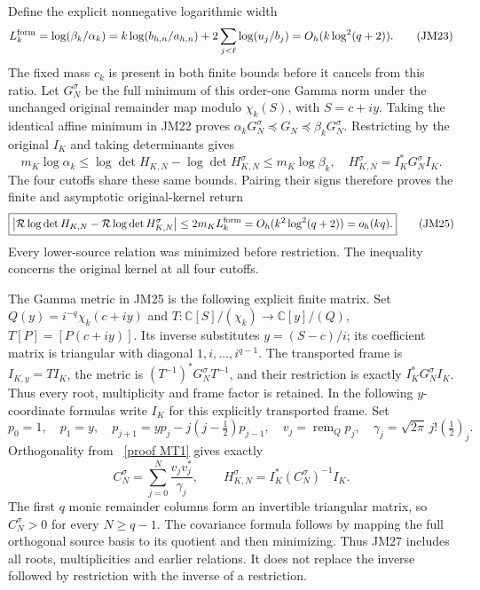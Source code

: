 \documentclass[11pt]{article}
\newcommand{\C}{\mathbb C}
\begin{document}
Define the explicit nonnegative logarithmic width
\[
 L_k^{\rm form}=\log(\beta_k/\alpha_k)
 =k\log(b_{h,n}/a_{h,n})
   +2\sum_{j<\ell}\log(u_j/b_j)
 =O_h(k\log^2(q+2)).\tag{JM23}
\]
The fixed mass $c_k$ is present in both finite bounds before it
cancels from this ratio. Let $G_N^\sigma$ be the full minimum of
this order-one Gamma norm under the unchanged original remainder
map modulo $\chi_k(S)$, with $S=c+iy$.
Taking the identical affine minimum in JM22 proves
$\alpha_kG_N^\sigma\preceq G_N\preceq\beta_kG_N^\sigma$.
Restricting by the original $I_K$ and taking determinants gives
\[
 m_K\log\alpha_k\le
 \log\det H_{K,N}-\log\det H_{K,N}^\sigma
 \le m_K\log\beta_k,
 \quad H_{K,N}^\sigma=I_K^*G_N^\sigma I_K.\tag{JM24}
\]
The four cutoffs share these same bounds. Pairing their signs
therefore proves the finite and asymptotic original-kernel return
\[
 \boxed{\left|\mathcal R\log\det H_{K,N}
 -\mathcal R\log\det H_{K,N}^\sigma\right|
 \le2m_KL_k^{\rm form}=O_h(k^2\log^2(q+2))=o_h(kq).}
 \tag{JM25}
\]
Every lower-source relation was minimized before restriction.
The inequality concerns the original kernel at all four cutoffs.

The Gamma metric in JM25 is the following explicit finite matrix.
Set $Q(y)=i^{-q}\chi_k(c+iy)$ and
$T:\C[S]/(\chi_k)\longrightarrow\C[y]/(Q)$,
$T[P]=[P(c+iy)]$. Its inverse substitutes $y=(S-c)/i$;
its coefficient matrix is triangular with diagonal $1,i,\ldots,i^{q-1}$.
The transported frame is $I_{K,y}=TI_K$, the metric is
$(T^{-1})^*G_N^\sigma T^{-1}$, and their restriction is exactly
$I_K^*G_N^\sigma I_K$. Thus every root, multiplicity and frame
factor is retained. In the following $y$-coordinate formulas write
$I_K$ for this explicitly transported frame. Set
\[
 p_0=1,\quad p_1=y,\quad
 p_{j+1}=yp_j-j(j-\tfrac12)p_{j-1},\quad
 v_j=\operatorname{rem}_{Q}p_j,\quad
 \gamma_j=\sqrt{2\pi}\,j!(\tfrac12)_j.
 \tag{JM26}
\]
Orthogonality from \cite{MP}%
~\href{https://github.com/KokunoYumeto/zeta-function-research-reader/blob/main/workbenches/splitzero-tandem/continuations/20260921-kernel-degree-steps/providers/OBSERVATION_COMPLETE_PROOFS.tex\#L1629}{[proof MT1]}%
{} gives exactly
\[
 C_N^\sigma=\sum_{j=0}^N\frac{v_jv_j^*}{\gamma_j},\qquad
 H_{K,N}^\sigma=I_K^*(C_N^\sigma)^{-1}I_K.\tag{JM27}
\]
The first $q$ monic remainder columns form an invertible triangular
matrix, so $C_N^\sigma>0$ for every $N\ge q-1$. The covariance
formula follows by mapping the full orthogonal source basis to its
quotient and then minimizing. Thus JM27 includes all roots,
multiplicities and earlier relations. It does not replace the
inverse followed by restriction with the inverse of a restriction.
\end{document}
